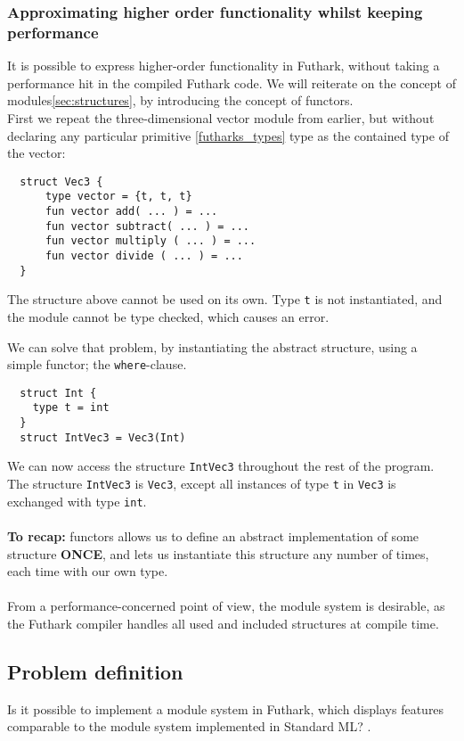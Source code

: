 \subsubsection{Approximating higher order functionality whilst keeping performance}
\label{subsec:higherorderfunctionality}
It is possible to express higher-order functionality in Futhark, without taking
a performance hit in the compiled Futhark code.
We will reiterate on the concept of modules\ref{sec:structures}, by introducing
the concept of functors.\\
First we repeat the three-dimensional vector module
from earlier, but without declaring any particular
primitive \ref{futharks_types} type as the contained type of the vector:
\begin{verbatim}
  struct Vec3 {
      type vector = {t, t, t}
      fun vector add( ... ) = ...
      fun vector subtract( ... ) = ...
      fun vector multiply ( ... ) = ...
      fun vector divide ( ... ) = ...
  }
\end{verbatim}
\noindent
The structure above cannot be used on its own. Type \texttt{t} is not
instantiated, and the module cannot be type checked, which causes an error.

\noindent
We can solve that problem, by instantiating the abstract structure, using a
simple functor; the \texttt{where}-clause.
\label{first_functor_example}
\begin{verbatim}
  struct Int {
    type t = int 
  }
  struct IntVec3 = Vec3(Int)
\end{verbatim}
\noindent
We can now access the structure \texttt{IntVec3} throughout the rest of the
program.
\\
The structure \texttt{IntVec3} is \texttt{Vec3}, except all instances
of type \texttt{t} in \texttt{Vec3} is exchanged with type \texttt{int}.
\\
\\
\textbf{To recap:} functors allows us to define an abstract implementation of some
structure \textbf{ONCE}, and lets us instantiate this structure any number of
times, each time with our own type.
\\
\\
From a performance-concerned point of view, the module system is desirable, as the Futhark compiler handles all used and included structures at compile time.
\subsection{Problem definition}
\label{subsec:probdef}
Is it possible to implement a module system in Futhark, which displays features
comparable to the module system implemented in Standard ML? \cite{crash_course}.

